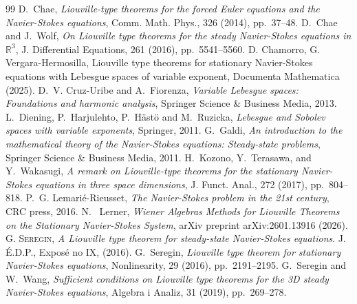 \documentclass[a4paper,12pt]{amsart}
\theoremstyle{definition}
\theoremstyle{plain}
\begin{document}
\begin{thebibliography}{99}
{\sc D.~Chae}, {\em Liouville-type theorems for the forced {E}uler equations
  and the {N}avier-{S}tokes equations}, Comm. Math. Phys., 326 (2014),
  pp.~37--48.
%
{\sc D.~Chae and J.~Wolf}, {\em On {L}iouville type theorems for the steady
  {N}avier-{S}tokes equations in {$\mathbb{R}^3$}}, J. Differential Equations,
  261 (2016), pp.~5541--5560.
%
 D. Chamorro,  G. Vergara-Hermosilla, Liouville type theorems for stationary Navier-Stokes equations with Lebesgue spaces of variable exponent, Documenta Mathematica (2025).
%
{\sc D.~V. Cruz-Uribe and A.~Fiorenza}, {\em Variable {L}ebesgue spaces:
Foundations and harmonic analysis}, Springer Science \& Business Media, 2013.
%
{\sc L.~Diening, P.~Harjulehto, P.~H{\"a}st{\"o} and M.~Ruzicka}, {\em
Lebesgue and Sobolev spaces with variable exponents}, Springer, 2011.
%
{\sc G.~Galdi}, {\em An introduction to the mathematical theory of the
{N}avier-{S}tokes equations: Steady-state problems}, Springer Science \&
Business Media, 2011.
%
{\sc H.~Kozono, Y.~Terasawa, and Y.~Wakasugi}, {\em A remark on
  {L}iouville-type theorems for the stationary {N}avier-{S}tokes equations in
  three space dimensions}, J. Funct. Anal., 272 (2017), pp.~804--818.
%
{\sc P.~G. Lemari{\'e}-Rieusset},
{\em The {N}avier-{S}tokes problem in the 21st century}, CRC press, 2016.
%
%
{\sc N.~
Lerner},   {\em Wiener Algebras Methods for Liouville Theorems on the Stationary Navier-Stokes System}, arXiv preprint arXiv:2601.13916  (2026).
%
G. \textsc{Seregin}, \emph{A Liouville type theorem for steady-state Navier-Stokes equations}.  
J. {\'E}.D.P., Expos{\'e} no IX, (2016).
%
{\sc G.~Seregin}, {\em Liouville type theorem for stationary {N}avier-{S}tokes
  equations}, Nonlinearity, 29 (2016), pp.~2191--2195.
%
{\sc G.~Seregin and W.~Wang}, {\em Sufficient conditions on {L}iouville type
  theorems for the 3{D} steady {N}avier-{S}tokes equations}, Algebra i Analiz,
  31 (2019), pp.~269--278.
%
\end{thebibliography}
 

 
\end{document}
